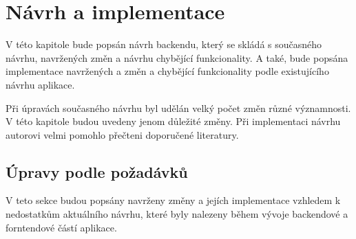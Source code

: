 \chapter{Návrh a implementace}
V této kapitole bude popsán návrh backendu, který se skládá s současného návrhu, navržených změn a návrhu chybějící funkcionality. A také, bude popsána implementace navržených a změn a chybějící funkcionality podle existujícího návrhu aplikace.

Při úpravách současného návrhu byl udělán velký počet změn různé významnosti. V této kapitole budou uvedeny jenom důležité změny. Při implementaci návrhu autorovi velmi pomohlo přečteni doporučené literatury.\cite{pro-spring-boot-2}

\section{Úpravy podle požadávků}\label{navrh:upravy}
    V teto sekce budou popsány navrženy změny a jejích implementace vzhledem k nedostatkům aktuálního návrhu, které byly nalezeny během vývoje backendové a forntendové částí aplikace. 
    
